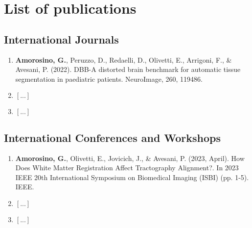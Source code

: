 \chapter*{List of publications}
\section*{International Journals}
\begin{enumerate}

 	\item \textbf{Amorosino, G.}, Peruzzo, D., Redaelli, D., Olivetti, E., Arrigoni, F., \&  Avesani, P. (2022). DBB-A distorted brain benchmark for automatic tissue segmentation in paediatric patients. NeuroImage, 260, 119486.
 
	\item $[...]$
	
	\item $[...]$
\end{enumerate}
\section*{International Conferences and Workshops}

\begin{enumerate}
	\item \textbf{Amorosino, G.}, Olivetti, E., Jovicich, J., \&  Avesani, P. (2023, April). How Does White Matter Registration Affect Tractography Alignment?. In 2023 IEEE 20th International Symposium on Biomedical Imaging (ISBI) (pp. 1-5). IEEE.  
	\item $[...]$
	\item $[...]$
\end{enumerate}